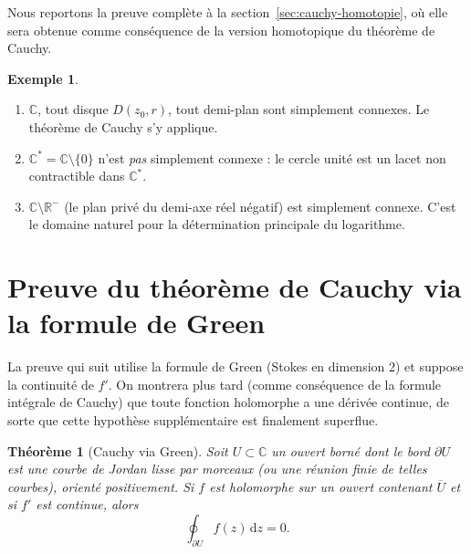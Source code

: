 \documentclass[12pt,a4paper,openany]{book}
\theoremstyle{definition}
\newtheorem{exemple}[definition]{Exemple}
\theoremstyle{plain}
\newtheorem{theoreme}[definition]{Théorème}
\theoremstyle{remark}
\newcommand{\C}{\mathbb{C}}
\newcommand{\R}{\mathbb{R}}
\newcommand{\dd}{\mathrm{d}}
\newcommand{\conj}[1]{\overline{#1}}
\begin{document}
Nous reportons la preuve complète à la section~\ref{sec:cauchy-homotopie},
où elle sera obtenue comme conséquence de la version homotopique du théorème
de Cauchy.

\begin{exemple}\label{ex:cauchy-exemples-domaines}
\leavevmode
\begin{enumerate}[label=\textup{(\arabic*)}]
  \item $\C$, tout disque $D(z_0, r)$, tout demi-plan sont simplement connexes.
    Le théorème de Cauchy s'y applique.
  \item $\C^* = \C \setminus \{0\}$ n'est \emph{pas} simplement connexe :
    le cercle unité est un lacet non contractible dans $\C^*$.
  \item $\C \setminus \R^-$ (le plan privé du demi-axe réel négatif) est
    simplement connexe. C'est le domaine naturel pour la détermination
    principale du logarithme.
\end{enumerate}
\end{exemple}

\section{Preuve du théorème de Cauchy via la formule de Green}\label{sec:cauchy-green}

La preuve qui suit utilise la formule de Green (Stokes en dimension 2) et
suppose la continuité de $f'$. On montrera plus tard (comme conséquence
de la formule intégrale de Cauchy) que toute fonction holomorphe a une dérivée
continue, de sorte que cette hypothèse supplémentaire est finalement
superflue.

\begin{theoreme}[Cauchy via Green]\label{thm:cauchy-green}
Soit $U \subset \C$ un ouvert borné dont le bord $\partial U$ est une courbe
de Jordan lisse par morceaux (ou une réunion finie de telles courbes), orienté
positivement. Si $f$ est holomorphe sur un ouvert contenant $\conj{U}$ et si
$f'$ est continue, alors
\[
  \oint_{\partial U} f(z)\,\dd z = 0.
\]
\end{theoreme}
\end{document}
